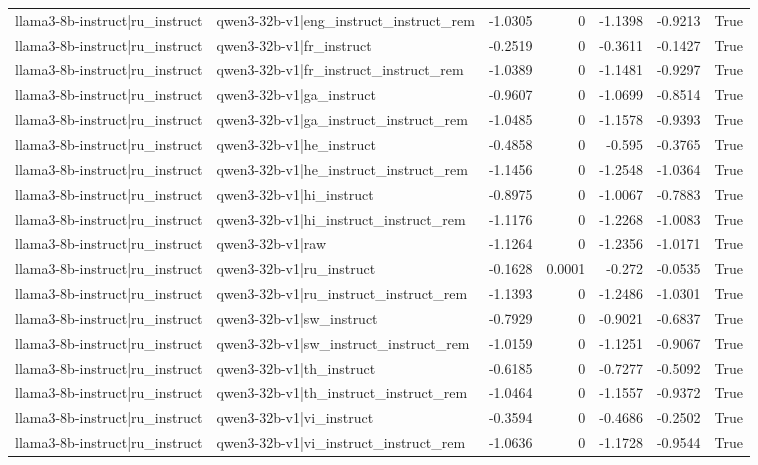 \begin{table}
\begin{tabular}{l l r r r r l}
llama3-8b-instruct|ru_instruct & qwen3-32b-v1|eng_instruct_instruct_rem & -1.0305 & 0 & -1.1398 & -0.9213 & True \\
llama3-8b-instruct|ru_instruct & qwen3-32b-v1|fr_instruct & -0.2519 & 0 & -0.3611 & -0.1427 & True \\
llama3-8b-instruct|ru_instruct & qwen3-32b-v1|fr_instruct_instruct_rem & -1.0389 & 0 & -1.1481 & -0.9297 & True \\
llama3-8b-instruct|ru_instruct & qwen3-32b-v1|ga_instruct & -0.9607 & 0 & -1.0699 & -0.8514 & True \\
llama3-8b-instruct|ru_instruct & qwen3-32b-v1|ga_instruct_instruct_rem & -1.0485 & 0 & -1.1578 & -0.9393 & True \\
llama3-8b-instruct|ru_instruct & qwen3-32b-v1|he_instruct & -0.4858 & 0 & -0.595 & -0.3765 & True \\
llama3-8b-instruct|ru_instruct & qwen3-32b-v1|he_instruct_instruct_rem & -1.1456 & 0 & -1.2548 & -1.0364 & True \\
llama3-8b-instruct|ru_instruct & qwen3-32b-v1|hi_instruct & -0.8975 & 0 & -1.0067 & -0.7883 & True \\
llama3-8b-instruct|ru_instruct & qwen3-32b-v1|hi_instruct_instruct_rem & -1.1176 & 0 & -1.2268 & -1.0083 & True \\
llama3-8b-instruct|ru_instruct & qwen3-32b-v1|raw & -1.1264 & 0 & -1.2356 & -1.0171 & True \\
llama3-8b-instruct|ru_instruct & qwen3-32b-v1|ru_instruct & -0.1628 & 0.0001 & -0.272 & -0.0535 & True \\
llama3-8b-instruct|ru_instruct & qwen3-32b-v1|ru_instruct_instruct_rem & -1.1393 & 0 & -1.2486 & -1.0301 & True \\
llama3-8b-instruct|ru_instruct & qwen3-32b-v1|sw_instruct & -0.7929 & 0 & -0.9021 & -0.6837 & True \\
llama3-8b-instruct|ru_instruct & qwen3-32b-v1|sw_instruct_instruct_rem & -1.0159 & 0 & -1.1251 & -0.9067 & True \\
llama3-8b-instruct|ru_instruct & qwen3-32b-v1|th_instruct & -0.6185 & 0 & -0.7277 & -0.5092 & True \\
llama3-8b-instruct|ru_instruct & qwen3-32b-v1|th_instruct_instruct_rem & -1.0464 & 0 & -1.1557 & -0.9372 & True \\
llama3-8b-instruct|ru_instruct & qwen3-32b-v1|vi_instruct & -0.3594 & 0 & -0.4686 & -0.2502 & True \\
llama3-8b-instruct|ru_instruct & qwen3-32b-v1|vi_instruct_instruct_rem & -1.0636 & 0 & -1.1728 & -0.9544 & True \\

\end{tabular}
\end{table}
